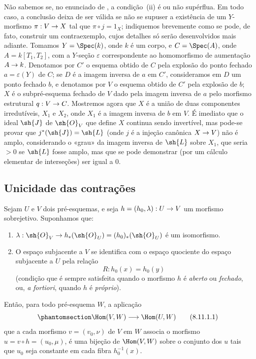 \documentclass[oneside,10pt]{amsart}
\makeatletter
\newcommand{\ega@arrow}[2]{\mathchoice{#1}{#2}{#2}{#2}}
\renewcommand{\to}{\ega@arrow{\longrightarrow}{\rightarrow}}
\newcommand{\oldpage}[2][]{\marginnote{\normalfont\footnotesize\textbf{#1}~|~#2}\ignorespaces}
\let\EGAOriginalLabel\label
\renewcommand{\label}[1]{\phantomsection\EGAOriginalLabel{#1}}
\makeatother
\begin{document}
\begin{remark}[8.10.7]
\label{II.8.10.7}
Não sabemos se, no enunciado de , a condição~(ii) é ou não supérflua.
Em todo caso, a conclusão deixa de ser válida se não se supuser a existência de um $Y$-morfismo $\pi:V\to X$ tal que $\pi\circ j=1_X$;
indiquemos brevemente como se pode, de fato, construir um contraexemplo, cujos detalhes só serão desenvolvidos mais adiante.
Tomamos $Y=\Spec(k)$, onde $k$ é um corpo, e $C=\Spec(A)$, onde $A=k[T_1,T_2]$, com a $Y$-seção $\varepsilon$ correspondente ao homomorfismo de aumentação $A\to k$.
Denotamos por $C'$ o esquema obtido de $C$ pela explosão do ponto fechado $a=\varepsilon(Y)$ de $C$;
se $D$ é a imagem inversa de $a$ em $C'$, consideramos em $D$ um ponto fechado $b$,
\oldpage[II]{189}
e denotamos por $V$ o esquema obtido de $C'$ pela explosão de $b$;
$X$ é o subpré-esquema fechado de $V$ dado pela imagem inversa de $a$ pelo morfismo estrutural $q:V\to C$.
Mostremos agora que $X$ é a união de duas componentes irredutíveis, $X_1$ e $X_2$, onde $X_1$ é a imagem inversa de $b$ em $V$.
É imediato que o ideal $\sh{J}$ de $\sh{O}_V$ que define $X$ continua sendo invertível, mas pode-se provar que $j^*(\sh{J})=\sh{L}$ (onde $j$ é a injeção canônica $X\to V$) não é amplo, considerando o «grau» da imagem inversa de $\sh{L}$ sobre $X_1$, que seria $>0$ se $\sh{L}$ fosse amplo, mas que se pode demonstrar (por um cálculo elementar de interseções) ser igual a $0$.
\end{remark}

\subsection{Unicidade das contrações}
\label{subsection:II.8.11}

\begin{lemma}[8.11.1]
\label{II.8.11.1}
Sejam $U$ e $V$ dois pré-esquemas, e seja $h=(h_0,\lambda):U\to V$ um morfismo sobrejetivo.
Suponhamos que:
\begin{enumerate}
  \item[$1^\circ$] $\lambda:\sh{O}_V\to h_*(\sh{O}_U)=(h_0)_*(\sh{O}_U)$ é um isomorfismo.
  \item[$2^\circ$] O espaço subjacente a $V$ se identifica com o espaço quociente do espaço subjacente a $U$ pela relação
  \[
      R:h_0(x)=h_0(y)
  \]
  (condição que é sempre satisfeita quando o morfismo $h$ é \emph{aberto} ou \emph{fechado}, ou, \emph{a fortiori}, quando $h$ é \emph{próprio}).
\end{enumerate}
Então, para todo pré-esquema $W$, a aplicação
\[
\label{II.8.11.1.1}
    \Hom(V,W)\longrightarrow\Hom(U,W)
\tag{8.11.1.1}
\]
que a cada morfismo $v=(v_0,\nu)$ de $V$ em $W$ associa o morfismo $u=v\circ h=(u_0,\mu)$, é uma bijeção de $\Hom(V,W)$ sobre o conjunto dos $u$ tais que $u_0$ seja constante em cada fibra $h_0^{-1}(x)$.
\end{lemma}
\end{document}

